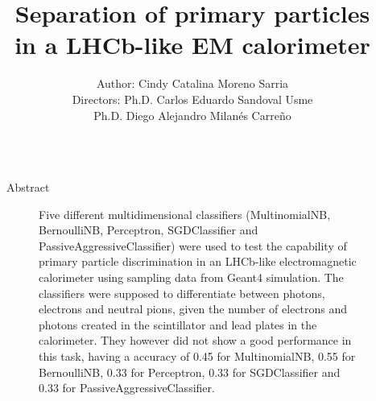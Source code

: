 \documentclass{beamer}
\title[Beamer Poster]{\huge{Separation of primary particles\\in a LHCb-like EM calorimeter}}
\author[afmorenosa@unal.edu.co]{
Author: Cindy Catalina Moreno Sarria\\
Directors: Ph.D. Carlos Eduardo Sandoval Usme\\
Ph.D. Diego Alejandro Milanés Carreño
}
\institute[UNAL]
{
FENYX\\
Programa de Pregrado en Física
}
\date{}
\newlength{\sepwidthA} %
\newlength{\colwidthA} %
\newcommand{\separatorcolumnA}{\begin{column}{\sepwidthA}\end{column}}
\begin{document}
\begin{frame}{}


    \begin{columns}[t]
      \separatorcolumnA
      \begin{column}{\colwidthA}

        \begin{block}{Abstract}
          \begin{figure}
            {\small Five different multidimensional classifiers (MultinomialNB,
            BernoulliNB, Perceptron, SGDClassifier and
            PassiveAggressiveClassifier) were used to test the capability of
            primary particle discrimination in an LHCb-like electromagnetic
            calorimeter using sampling data from Geant4 simulation. The
            classifiers were supposed to differentiate between photons,
            electrons and neutral pions, given the number of electrons and
            photons created in the scintillator and lead plates in the
            calorimeter. They however did not show a good performance in this
            task, having a accuracy of 0.45 for MultinomialNB, 0.55 for
            BernoulliNB, 0.33 for Perceptron, 0.33 for SGDClassifier and 0.33
            for PassiveAggressiveClassifier.}
          \end{figure}
        \end{block}


\end{column}
\end{columns}
\end{frame}
\end{document}
